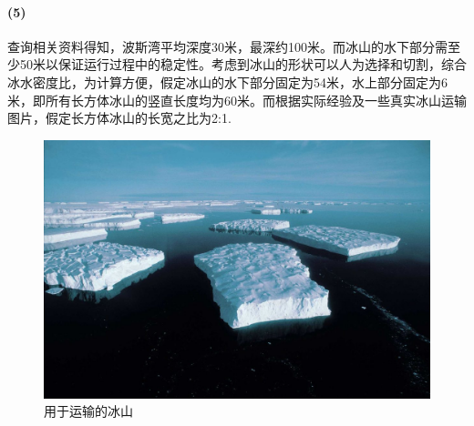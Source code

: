 \documentclass[a4paper,12pt,onecolumn,twoside]{article}
\begin{document}
\paragraph{(5)}查询相关资料得知，波斯湾平均深度30米，最深约100米。而冰山的水下部分需至少50米以保证运行过程中的稳定性。考虑到冰山的形状可以人为选择和切割，综合冰水密度比，为计算方便，假定冰山的水下部分固定为54米，水上部分固定为6米，即所有长方体冰山的竖直长度均为60米。而根据实际经验及一些真实冰山运输图片，假定长方体冰山的长宽之比为2:1.
\begin{figure}[H]
	\centering
	\includegraphics[scale=0.26]{res2/Iceberg.jpg}
	\caption{用于运输的冰山}
\end{figure} 
\end{document}
